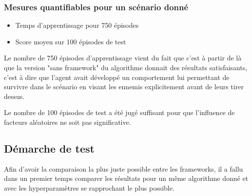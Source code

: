 \documentclass[a4paper,10pt,openany,oneside]{report}
\begin{document}
\subsubsection*{Mesures quantifiables pour un scénario donné}
\begin{itemize}
	\item Temps d'apprentissage pour 750 épisodes
	\item Score moyen sur 100 épisodes de test
\end{itemize}
Le nombre de 750 épisodes d'apprentissage vient du fait que c'est à partir de là que la version "sans framework" \cite[]{sansFramework} du algorithme donnait des résultats satisfaisants, c'est à dire que l'agent avait développé un comportement lui permettant de survivre dans le scénario en visant les ennemis explicitement avant de leurs tirer dessus.


Le nombre de 100 épisodes de test a été jugé suffisant pour que l'influence de facteurs aléatoires ne soit pas significative.
\newpage
\subsection{Démarche de test}
Afin d'avoir la comparaison la plus juste possible entre les frameworks, il a fallu dans un premier temps comparer les résultats pour un même algorithme donné et avec les hyperparamètres se rapprochant le plus possible.
\end{document}
